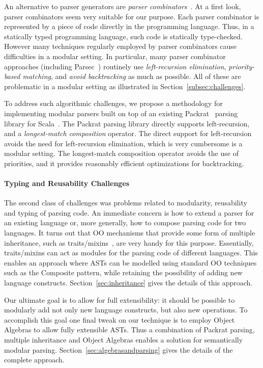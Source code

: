   An alternative to parser generators are \emph{parser
    combinators}~\cite{burge1975,Wadler1985}.  At a first look, parser
  combinators seem very suitable for our purpose. Each parser
  combinator is represented by a piece of code directly in the
  programming language. Thus, in a statically typed programming
  language, such code is statically type-checked.  However many
  techniques regularly employed by parser combinators cause difficulties in a
  modular setting. In particular, many parser combinator approaches
  (including Parsec~\cite{Leijen2001}) routinely use \emph{left-recursion
    elimination}, \emph{priority-based matching}, and \emph{avoid
    backtracking} as much as possible. All of these are problematic in
  a modular setting as illustrated in Section~\ref{subsec:challenges}.

  To address such algorithmic challenges, we propose a methodology
  for implementing modular parsers built on top of an
  existing Packrat~\cite{Ford2002} parsing library for Scala~\cite{odersky2004overview}. The Packrat parsing library
  directly supports left-recursion, and a \emph{longest-match
    composition} operator. The direct support for left-recursion
  avoids the need for left-recursion elimination, which is very
  cumbersome is a modular setting. The longest-match composition
  operator avoids the use of priorities, and it provides reasonably
  efficient optimizations for backtracking.

  \paragraph{Typing and Reusability Challenges} The second class of
  challenges was problems related to modularity, reusability and
  typing of parsing code. An immediate concern is how to extend a
  parser for an existing language or, more generally, how to compose
  parsing code for two languages. It turns out that OO mechanisms that
  provide some form of multiple inheritance,
  such as traits/mixins~\cite{Bracha1990,Scharli2003}, are very handy for this
  purpose. Essentially, traits/mixins can act as modules for the parsing code
  of different languages. This enables an approach where ASTs can be
  modelled using standard OO techniques such as the {\sc Composite}
  pattern, while retaining the possibility of adding new language
  constructs. Section~\ref{sec:inheritance} gives the details of this approach.

  Our ultimate goal is to allow for full extensibility: it should be
  possible to modularly add not only new language constructs, but
  also new operations. To accomplish this goal one final tweak on our
  technique is to employ Object Algebras to allow fully extensible
  ASTs. Thus a combination of Packrat parsing, multiple inheritance
  and Object Algebras enables a solution for semantically modular
  parsing. Section~\ref{sec:algebrasandparsing} gives the details of the complete approach.

